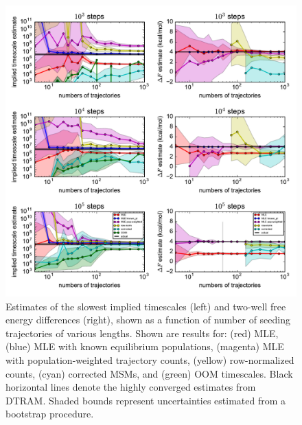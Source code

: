 \documentclass[%
 aip,
rsi,%
 amsmath,amssymb,
 reprint,%
]{revtex4-1}
\begin{document}
\begin{figure}
\includegraphics[width=1.7\columnwidth]{figures/convergence_oct2018.pdf}%
\caption{\label{fig:toy-estimation}Estimates of the slowest implied timescales (left) and two-well free energy differences (right), shown as a function of number of seeding trajectories of various lengths. Shown are results for: (red) MLE, (blue) MLE with known equilibrium populations, (magenta) MLE with population-weighted trajectory counts, (yellow) row-normalized counts, (cyan) corrected MSMs, and (green) OOM timescales. Black horizontal lines denote the highly converged estimates from DTRAM.  Shaded bounds represent uncertainties estimated from a bootstrap procedure.}
\end{figure}
\end{document}
